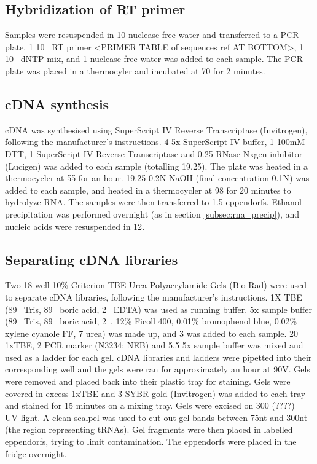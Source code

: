 \subsection{Hybridization of RT primer}
Samples were resuspended in 10\ul{} nuclease-free water and transferred to a PCR plate.
1\ul{} 10\si{\micro\Molar} RT primer <PRIMER TABLE of sequences ref AT BOTTOM>, 1\ul{} 10\si{\micro\Molar} dNTP mix, and 1\ul{} nuclease free water was added to each sample.
The PCR plate was placed in a thermocyler and incubated at 70\C{} for 2 minutes.

\subsection{cDNA synthesis}
cDNA was synthesised using SuperScript IV Reverse Transcriptase (Invitrogen), following the manufacturer's instructions.
4\ul{} 5x SuperScript IV buffer, 1\ul{} 100mM DTT, 1\ul{} SuperScript IV Reverse Transcriptase and 0.25\ul{} RNase Nxgen inhibitor (Lucigen) was added to each sample (totalling 19.25\ul{}).
The plate was heated in a thermocycler at 55\C{} for an hour.
19.25\ul{} 0.2N NaOH (final concentration 0.1N) was added to each sample, and heated in a thermocycler at 98\C{} for 20 minutes to hydrolyze RNA.
The samples were then transferred to 1.5\ml{} eppendorfs.
Ethanol precipitation was performed overnight (as in section \ref{subsec:rna_precip}), and nucleic acids were resuspended in 12\ul{}.

\subsection{Separating cDNA libraries}
Two 18-well 10\% Criterion TBE-Urea Polyacrylamide Gels (Bio-Rad) were used to separate cDNA libraries, following the manufacturer's instructions.
1X TBE (89\si{\milli\Molar} Tris, 89\si{\milli\Molar} boric acid, 2\si{\milli\Molar} EDTA) was used as running buffer.
5x sample buffer (89\si{\milli\Molar} Tris, 89\si{\milli\Molar} boric acid, 2\si{\milli\Molar}, 12\% Ficoll 400, 0.01\% bromophenol blue, 0.02\% xylene cyanole FF, 7\si{\Molar} urea) was made up, and 3\ul{} was added to each sample.
20\ul{} 1xTBE, 2\ul{} PCR marker (N3234; NEB) and 5.5\ul{} 5x sample buffer was mixed and used as a ladder for each gel.
cDNA libraries and ladders were pipetted into their corresponding well and the gels were ran for approximately an hour at 90V.
Gels were removed and placed back into their plastic tray for staining.
Gels were covered in excess 1xTBE and 3\ul{} SYBR gold (Invitrogen) was added to each tray and stained for 15 minutes on a mixing tray.
Gels were excised on 300 (????)\si{\nano\Molar} UV light.
A clean scalpel was used to cut out gel bands between 75nt and 300nt (the region representing tRNAs).
Gel fragments were then placed in labelled eppendorfs, trying to limit contamination.
The eppendorfs were placed in the fridge overnight.

